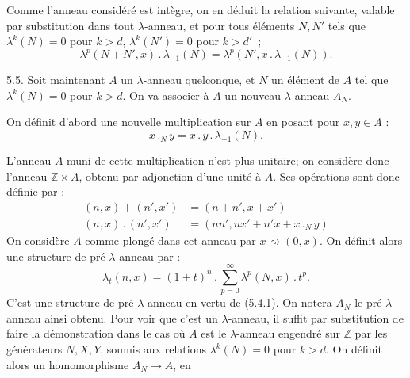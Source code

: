 

Comme l'anneau considéré est intègre, on en déduit la relation suivante, valable par substitution dans tout \(\lambda\)-anneau, et pour tous éléments \(N,N'\) tels que \(\lambda^k(N)=0\) pour \(k>d\), \(\lambda^k(N')=0\) pour \(k>d'\)~;
\begin{equation}\tag{5.4.2}
  \lambda^p(N+N',x)\mathbin{.}\lambda_{-1}(N)=\lambda^p(N',x\mathbin{.}\lambda_{-1}(N)).
\end{equation}


5.5. Soit maintenant \(A\) un \(\lambda\)-anneau quelconque, et \(N\) un élément de \(A\) tel que \(\lambda^k(N)=0\) pour \(k>d\). On va associer à \(A\) un nouveau \(\lambda\)-anneau \(A_N\).

On définit d'abord une nouvelle multiplication sur \(A\) en posant pour \(x,y\in A\) :
\begin{equation}\tag{5.5.1}
  x\mathbin{.}_N y=x\mathbin{.} y\mathbin{.}\lambda_{-1}(N).
\end{equation}

L'anneau \(A\) muni de cette multiplication n'est plus unitaire; on considère donc l'anneau \(\mathbb Z\times A\), obtenu par adjonction d'une unité à \(A\). Ses opérations sont donc définie par :
\begin{equation}\tag{5.5.2}
\begin{aligned}
  (n,x)+(n',x')&=(n+n',x+x')\\
  (n,x)\mathbin{.}(n',x')&=(nn',nx'+n'x+x\mathbin{.}_N y)
\end{aligned}
\end{equation}
On considère \(A\) comme plongé dans cet anneau par \(x\rightsquigarrow(0,x)\). On définit alors une structure de pré-\(\lambda\)-anneau par :
\begin{equation}\tag{5.5.3}
  \lambda_t(n,x)=(1+t)^n\mathbin{.}\sum_{p=0}^{\infty}\lambda^p(N,x)\mathbin{.} t^p.
\end{equation}
C'est une structure de pré-\(\lambda\)-anneau en vertu de (5.4.1). On notera \(A_N\) le pré-\(\lambda\)-anneau ainsi obtenu. Pour voir que c'est un \(\lambda\)-anneau, il suffit par substitution de faire la démonstration dans le cas où \(A\) est le \(\lambda\)-anneau engendré sur \(\mathbb Z\) par les générateurs \(N,X,Y\), soumis aux relations \(\lambda^k(N)=0\) pour \(k>d\). On définit alors un homomorphisme \(A_N\to A\), en
